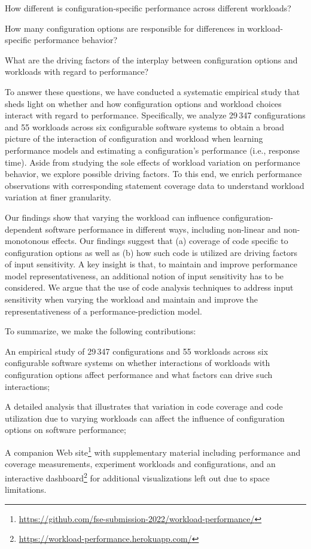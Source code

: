 \begin{compactitem}
	\item How different is configuration-specific performance across different workloads? 
	\item How many configuration options are responsible for differences in workload-specific performance behavior?
	\item What are the driving factors of the interplay between configuration options and workloads with regard to performance? 
\end{compactitem}

To answer these questions, we have conducted a systematic empirical study that sheds light on whether and how configuration options and workload choices interact with regard to performance. 
Specifically, we analyze 29\,347 configurations and 55 workloads across six configurable software systems to obtain a broad picture of the interaction of configuration and workload when learning performance models and estimating a configuration's performance (i.e., response time). Aside from studying the sole effects of workload variation on performance behavior, we explore possible driving factors. To this end, we enrich performance observations with corresponding statement coverage data to understand workload variation at finer granularity.

Our findings show that varying the workload can influence con\-fi\-gu\-ra\-tion-de\-pen\-dent software performance in different ways, including non-linear and non-monotonous effects. Our findings suggest that (a) coverage of code  specific to configuration options as well as (b) how such code is utilized are driving factors of input sensitivity. A key insight is that, to maintain and improve performance model representativeness, an additional notion of input sensitivity has to be considered. We argue that the use of code analysis techniques to address input sensitivity when varying the workload and maintain and improve the representativeness of a performance-prediction model.

To summarize, we make the following contributions: 

\begin{compactitem}
	\item An empirical study of 29\,347 configurations and 55 workloads across six configurable software systems on whether interactions of workloads with configuration options affect performance and what factors can drive such interactions;
	
	\item A detailed analysis that illustrates that variation in code coverage and code utilization due to varying workloads can affect the influence of configuration options on software performance; 
	
	\item A companion Web site\footnote{\url{https://github.com/fse-submission-2022/workload-performance/}} with supplementary material including performance and coverage measurements, experiment workloads and configurations, and an interactive dashboard\footnote{\url{https://workload-performance.herokuapp.com/}} for additional visualizations left out due to space limitations.
\end{compactitem}


